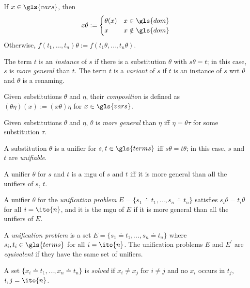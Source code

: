 \begin{dfn}
    If \(x \in \gls{vars}\), then
    \begin{equation*}
        x\theta := \begin{cases}
            \theta(x) & x \in \gls{dom} \\
            x & x \notin \gls{dom}
        \end{cases}
    \end{equation*}
    Otherwise, \(f(t_1,\dotsc,t_n)\theta := f(t_1\theta,\dotsc,t_n\theta)\).

    The term \(t\) is an \emph{instance} of \(s\) if there is a substitution \(\theta\) with \(s\theta = t\); in this case, \(s\) is \emph{more general} than \(t\).
    The term \(t\) is a \emph{variant} of \(s\) if \(t\) is an instance of \(s\) wrt \(\theta\) and \(\theta\) is a renaming.
\end{dfn}

\begin{dfn}[Composition]
    Given substitutions \(\theta\) and \(\eta\), their \emph{composition} is defined as \((\theta\eta)(x) := (x\theta)\eta\) for \(x \in \gls{vars}\).
\end{dfn}

\begin{dfn}
    Given substitutions \(\theta\) and \(\eta\), \(\theta\) is \emph{more general} than \(\eta\) iff \(\eta = \theta\tau\) for some substitution \(\tau\).
\end{dfn}

\begin{dfn}[Unifiers]
    A substitution \(\theta\) is a unifier for \(s,t \in \gls{terms}\) iff \(s\theta = t\theta\); in this case, \(s\) and \(t\) are \emph{unifiable}.

    A unifier \(\theta\) for \(s\) and \(t\) is a \gls{mgu} of \(s\) and \(t\) iff it is more general than all the unifiers of \(s\), \(t\).

    A unifier \(\theta\) for the \emph{unification problem} \(E = \lbrace s_1 \doteq t_1,\dotsc, s_n \doteq t_n \rbrace\) satisfies \(s_i\theta = t_i\theta\) for all \(i = \ito{n}\), and it is the \gls{mgu} of \(E\) if it is more general than all the unifiers of \(E\).
\end{dfn}

\begin{dfn}
    A \emph{unification problem} is a set \(E = \lbrace s_1 \doteq t_1,\dotsc, s_n \doteq t_n \rbrace\) where \(s_i,t_i \in \gls{terms}\) for all \(i = \ito{n}\).
    The unification problems \(E\) and \(E^\prime\) are \emph{equivalent} if they have the same set of unifiers.

    A set \(\lbrace x_i \doteq t_1,\dotsc,x_n \doteq t_n \rbrace\) is \emph{solved} if \(x_i \ne x_j\) for \(i \ne j\) and no \(x_i\) occurs in \(t_j\), \(i,j = \ito{n}\).
\end{dfn}

